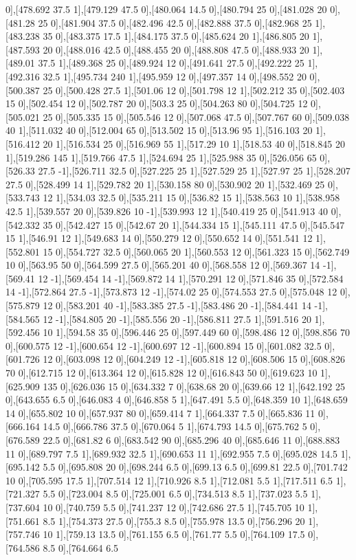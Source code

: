 {0],[478.692 37.5 1],[479.129 47.5 0],[480.064 14.5 0],[480.794 25 0],[481.028 20 0],[481.28 25 0],[481.904 37.5 0],[482.496 42.5 0],[482.888 37.5 0],[482.968 25 1],[483.238 35 0],[483.375 17.5 1],[484.175 37.5 0],[485.624 20 1],[486.805 20 1],[487.593 20 0],[488.016 42.5 0],[488.455 20 0],[488.808 47.5 0],[488.933 20 1],[489.01 37.5 1],[489.368 25 0],[489.924 12 0],[491.641 27.5 0],[492.222 25 1],[492.316 32.5 1],[495.734 240 1],[495.959 12 0],[497.357 14 0],[498.552 20 0],[500.387 25 0],[500.428 27.5 1],[501.06 12 0],[501.798 12 1],[502.212 35 0],[502.403 15 0],[502.454 12 0],[502.787 20 0],[503.3 25 0],[504.263 80 0],[504.725 12 0],[505.021 25 0],[505.335 15 0],[505.546 12 0],[507.068 47.5 0],[507.767 60 0],[509.038 40 1],[511.032 40 0],[512.004 65 0],[513.502 15 0],[513.96 95 1],[516.103 20 1],[516.412 20 1],[516.534 25 0],[516.969 55 1],[517.29 10 1],[518.53 40 0],[518.845 20 1],[519.286 145 1],[519.766 47.5 1],[524.694 25 1],[525.988 35 0],[526.056 65 0],[526.33 27.5 -1],[526.711 32.5 0],[527.225 25 1],[527.529 25 1],[527.97 25 1],[528.207 27.5 0],[528.499 14 1],[529.782 20 1],[530.158 80 0],[530.902 20 1],[532.469 25 0],[533.743 12 1],[534.03 32.5 0],[535.211 15 0],[536.82 15 1],[538.563 10 1],[538.958 42.5 1],[539.557 20 0],[539.826 10 -1],[539.993 12 1],[540.419 25 0],[541.913 40 0],[542.332 35 0],[542.427 15 0],[542.67 20 1],[544.334 15 1],[545.111 47.5 0],[545.547 15 1],[546.91 12 1],[549.683 14 0],[550.279 12 0],[550.652 14 0],[551.541 12 1],[552.801 15 0],[554.727 32.5 0],[560.065 20 1],[560.553 12 0],[561.323 15 0],[562.749 10 0],[563.95 50 0],[564.599 27.5 0],[565.201 40 0],[568.558 12 0],[569.367 14 -1],[569.41 12 -1],[569.454 14 -1],[569.872 14 1],[570.291 12 0],[571.846 35 0],[572.584 14 -1],[572.864 27.5 -1],[573.873 12 -1],[574.02 25 0],[574.553 27.5 0],[575.048 12 0],[575.879 12 0],[583.201 40 -1],[583.385 27.5 -1],[583.486 20 -1],[584.441 14 -1],[584.565 12 -1],[584.805 20 -1],[585.556 20 -1],[586.811 27.5 1],[591.516 20 1],[592.456 10 1],[594.58 35 0],[596.446 25 0],[597.449 60 0],[598.486 12 0],[598.856 70 0],[600.575 12 -1],[600.654 12 -1],[600.697 12 -1],[600.894 15 0],[601.082 32.5 0],[601.726 12 0],[603.098 12 0],[604.249 12 -1],[605.818 12 0],[608.506 15 0],[608.826 70 0],[612.715 12 0],[613.364 12 0],[615.828 12 0],[616.843 50 0],[619.623 10 1],[625.909 135 0],[626.036 15 0],[634.332 7 0],[638.68 20 0],[639.66 12 1],[642.192 25 0],[643.655 6.5 0],[646.083 4 0],[646.858 5 1],[647.491 5.5 0],[648.359 10 1],[648.659 14 0],[655.802 10 0],[657.937 80 0],[659.414 7 1],[664.337 7.5 0],[665.836 11 0],[666.164 14.5 0],[666.786 37.5 0],[670.064 5 1],[674.793 14.5 0],[675.762 5 0],[676.589 22.5 0],[681.82 6 0],[683.542 90 0],[685.296 40 0],[685.646 11 0],[688.883 11 0],[689.797 7.5 1],[689.932 32.5 1],[690.653 11 1],[692.955 7.5 0],[695.028 14.5 1],[695.142 5.5 0],[695.808 20 0],[698.244 6.5 0],[699.13 6.5 0],[699.81 22.5 0],[701.742 10 0],[705.595 17.5 1],[707.514 12 1],[710.926 8.5 1],[712.081 5.5 1],[717.511 6.5 1],[721.327 5.5 0],[723.004 8.5 0],[725.001 6.5 0],[734.513 8.5 1],[737.023 5.5 1],[737.604 10 0],[740.759 5.5 0],[741.237 12 0],[742.686 27.5 1],[745.705 10 1],[751.661 8.5 1],[754.373 27.5 0],[755.3 8.5 0],[755.978 13.5 0],[756.296 20 1],[757.746 10 1],[759.13 13.5 0],[761.155 6.5 0],[761.77 5.5 0],[764.109 17.5 0],[764.586 8.5 0],[764.664 6.5 }
